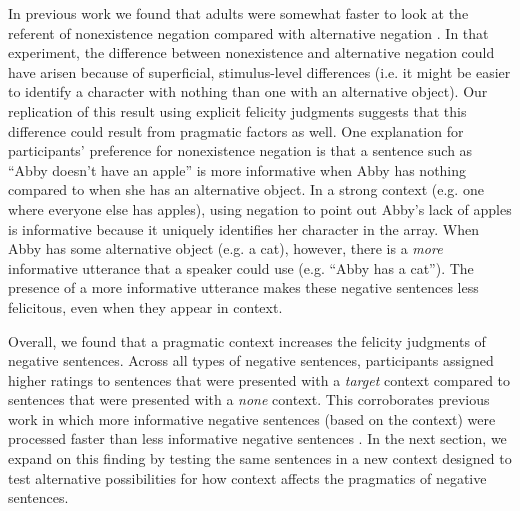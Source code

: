 \documentclass[10pt,letterpaper]{article}
\begin{document}
In previous work we found that adults were somewhat faster to look at the referent of nonexistence negation compared with alternative negation \cite{nordmeyer2014b}. In that experiment, the difference between nonexistence and alternative negation could have arisen because of superficial, stimulus-level differences (i.e. it might be easier to identify a character with nothing than one with an alternative object). Our replication of this result using explicit felicity judgments suggests that this difference could result from pragmatic factors as well. One explanation for participants' preference for nonexistence negation is that a sentence such as ``Abby doesn't have an apple'' is more informative when Abby has nothing compared to when she has an alternative object.  In a strong context (e.g. one where everyone else has apples), using negation to point out Abby's lack of apples is informative because it uniquely identifies her character in the array.  When Abby has some alternative object (e.g. a cat), however, there is a \emph{more} informative utterance that a speaker could use (e.g. ``Abby has a cat'').  The presence of a more informative utterance makes these negative sentences less felicitous, even when they appear in context.

Overall, we found that a pragmatic context increases the felicity judgments of negative sentences.  Across all types of negative sentences, participants assigned higher ratings to sentences that were presented with a \emph{target} context compared to sentences that were presented with a \emph{none} context.  This corroborates previous work in which more informative negative sentences (based on the context) were processed faster than less informative negative sentences \cite{nordmeyer2014}.  In the next section, we expand on this finding by testing the same sentences in a new context designed to test alternative possibilities for how context affects the pragmatics of negative sentences.
\end{document}
